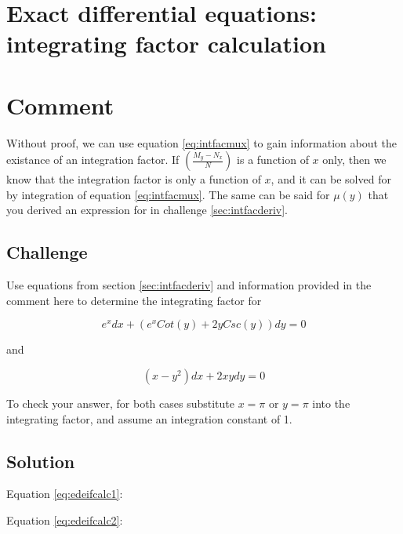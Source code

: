 



\newpage
\section{Exact differential equations: integrating factor calculation}
\label{sec:edeifcalc}

\section*{Comment}
Without proof, we can use equation \ref{eq:intfacmux} to gain information about the existance of an integration factor. If $\left ( \frac{M_y-N_x}{N} \right )$ is a function of $x$ only, then we know that the integration factor is only a function of $x$, and it can be solved for by integration of equation \ref{eq:intfacmux}. The same can be said for $\mu(y)$ that you derived an expression for in challenge \ref{sec:intfacderiv}.

\subsection*{Challenge}
Use equations from section \ref{sec:intfacderiv} and information provided in the comment here to determine the integrating factor for

\begin{equation}
    \label{eq:edeifcalc1}
    e^x dx + (e^x Cot(y) + 2y Csc(y)) dy = 0
\end{equation}

and

\begin{equation}
    \label{eq:edeifcalc2}
    (x-y^2) dx + 2xy dy = 0
\end{equation}

To check your answer, for both cases substitute $x=\pi$ or $y=\pi$ into the integrating factor, and assume an integration constant of 1.

\subsection*{Solution}


Equation \ref{eq:edeifcalc1}: 

Equation \ref{eq:edeifcalc2}: 




